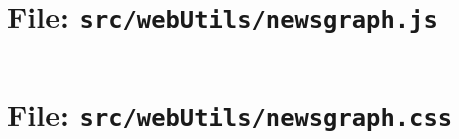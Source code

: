 \begin{landscape}
\begin{multicols}{2}
\section{File: \texttt{src/webUtils/newsgraph.js}} \label{sec:newsgraph.js}
\inputminted[fontsize=\scriptsize,linenos,numbersep=5pt]{js}{../src/webUtils/newsgraph.js}

\section{File: \texttt{src/webUtils/newsgraph.css}} \label{sec:newsgraph.css}
\inputminted[fontsize=\scriptsize,linenos,numbersep=5pt]{css}{../src/webUtils/newsgraph.css}


\end{multicols}
\end{landscape}